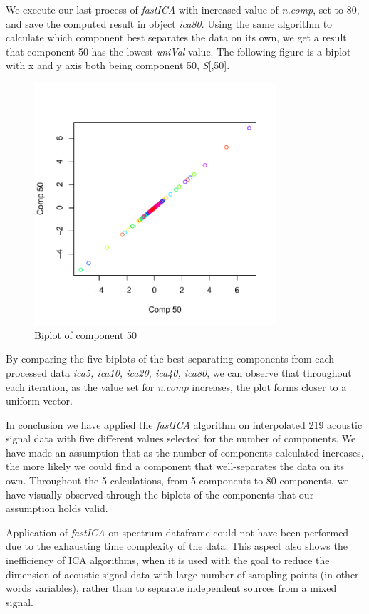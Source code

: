 We execute our last process of \emph{fastICA} with increased value of \emph{n.comp}, set to 80, and save the computed result in object \emph{ica80}. Using the same algorithm to calculate which component best separates the data on its own, we get a result that component 50 has the lowest \emph{uniVal} value. The following figure is a biplot with x and y axis both being component 50, \emph{S}[,50].
\begin{figure}[H]
    \centering
    \includegraphics[width=9cm]{images/ICA/[80]/comp 50.pdf}  
    \caption{Biplot of component 50}
    \label{fig:[80]comp50} 
\end{figure}

By comparing the five biplots of the best separating components from each processed data \emph{ica5, ica10, ica20, ica40, ica80}, we can observe that throughout each iteration, as the value set for \emph{n.comp} increases, the plot forms closer to a uniform vector.

In conclusion we have applied the \emph{fastICA} algorithm on interpolated 219 acoustic signal data with five different values selected for the number of components. We have made an assumption that as the number of components calculated increases, the more likely we could find a component that well-separates the data on its own. Throughout the 5 calculations, from 5 components to 80 components, we have visually observed through the biplots of the components that our assumption holds valid.

Application of \emph{fastICA} on spectrum dataframe could not have been performed due to the exhausting time complexity of the data. This aspect also shows the inefficiency of ICA algorithms, when it is used with the goal to reduce the dimension of acoustic signal data with large number of sampling points (in other words variables), rather than to separate independent sources from a mixed signal. 
